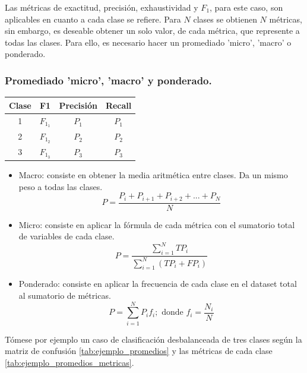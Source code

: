 Las métricas de exactitud, precisión, exhaustividad y $F_{1}$, para este caso, son aplicables en cuanto a cada clase se refiere. Para $N$ clases se obtienen $N$ métricas, sin embargo, es deseable obtener un solo valor, de cada métrica, que represente a todas las clases. Para ello, es necesario hacer un promediado 'micro', 'macro' o ponderado.

\subsubsection{Promediado 'micro', 'macro' y ponderado.}

\begin{table}
	\centering
	\begin{tabular}{|c|c|c|c|} 
		\hline
		Clase & F1  & Precisión & Recall  \\ 
		\hline
		1     & $F_{1_1}$ & $P_{1}$        & $P_{1}$      \\ 
		\hline
		2     & $F_{1_2}$ & $P_{2}$        & $P_{2}$      \\ 
		\hline
		3     & $F_{1_3}$ & $P_{3}$        & $P_{3}$      \\
		\hline
	\end{tabular}
\end{table}

\begin{itemize}
	\item Macro: consiste en obtener la media aritmética entre clases. Da un mismo peso a todas las clases.
		\begin{equation}
			P = \dfrac{P_{i}+P_{i+1}+P_{i+2}+\mbox{...}+P_{N}}{N}
		\end{equation}
	\item Micro: consiste en aplicar la fórmula de cada métrica con el sumatorio total de variables de cada clase. 
		\begin{equation}
			P = \dfrac{\sum_{i=1}^{N} TP_{i}}{\sum_{i=1}^{N} \left(TP_{i}+FP_{i}\right)}
		\end{equation}
	\item Ponderado: consiste en aplicar la frecuencia de cada clase en el dataset total al sumatorio de métricas.
		\begin{equation}
			P = \sum_{i=1}^{N} P_{i}f_{i}; \mbox{ donde } f_{i} = \dfrac{N_{i}}{N}
		\end{equation}
\end{itemize}

Tómese por ejemplo un caso de clasificación desbalanceada de tres clases según la matriz de confusión \ref{tab:ejemplo_promedios} y las métricas de cada clase \ref{tab:ejemplo_promedios_metricas}.

